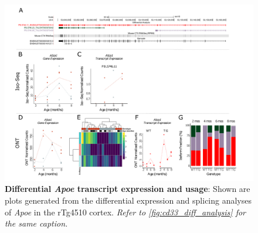 \begin{landscape}
	\begin{figure}[htp]
		\begin{center}
			\includegraphics[page=4,trim={0 0.5cm 0 1.5cm},scale =0.85]{Figures/TargetGene_DifferentialAnalysis.pdf}
		\end{center}
		\captionsetup{width=1.5\textwidth}
		\caption[Differential \textit{Apoe} transcript expression and usage]%
		{\textbf{Differential \textit{Apoe} transcript expression and usage}: Shown are plots generated from the differential expression and splicing analyses of \textit{Apoe} in the rTg4510 cortex. \textit{Refer to \cref{fig:cd33_diff_analysis} for the same caption.}}   
		\label{fig:Apoe_diff_analysis}
	\end{figure}
\end{landscape}


